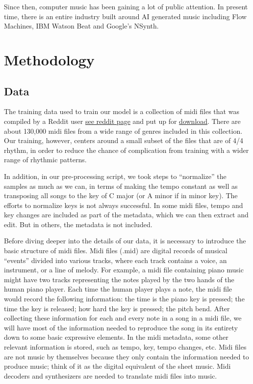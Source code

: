 \documentclass[12pt,oneside]{chicagocapstone}
\begin{document}
Since then, computer music has been gaining a lot of public attention. In present time, there is an entire industry built around AI generated music including Flow Machines, IBM Watson Beat and Google's NSynth.

\newpage

\hypertarget{methodology}{%
\chapter*{Methodology}\label{methodology}}

\hypertarget{methodology-data}{%
\section*{Data}\label{methodology-data}}

The training data used to train our model is a collection of midi files that was compiled by a Reddit user \href{https://www.reddit.com/r/WeAreTheMusicMakers/comments/3ajwe4/the_largest_midi_collection_on_the_internet/}{see reddit page} and put up for \href{https://mega.co.nz/\#!Elg1TA7T!MXEZPzq9s9YObiUcMCoNQJmCbawZqzAkHzY4Ym6Gs_Q}{download}. There are about 130,000 midi files from a wide range of genres included in this collection. Our training, however, centers around a small subset of the files that are of 4/4 rhythm, in order to reduce the chance of complication from training with a wider range of rhythmic patterns.

In addition, in our pre-processing script, we took steps to ``normalize'' the samples as much as we can, in terms of making the tempo constant as well as transposing all songs to the key of C major (or A minor if in minor key). The efforts to normalize keys is not always successful. In some midi files, tempo and key changes are included as part of the metadata, which we can then extract and edit. But in others, the metadata is not included.

Before diving deeper into the details of our data, it is necessary to introduce the basic structure of midi files. Midi files (.mid) are digital records of musical ``events'' divided into various tracks, where each track contains a voice, an instrument, or a line of melody. For example, a midi file containing piano music might have two tracks representing the notes played by the two hands of the human piano player. Each time the human player plays a note, the midi file would record the following information: the time is the piano key is pressed; the time the key is released; how hard the key is pressed; the pitch bend. After collecting these information for each and every note in a song in a midi file, we will have most of the information needed to reproduce the song in its entirety down to some basic expressive elements. In the midi metadata, some other relevant information is stored, such as tempo, key, tempo changes, etc. Midi files are not music by themselves because they only contain the information needed to produce music; think of it as the digital equivalent of the sheet music. Midi decoders and synthesizers are needed to translate midi files into music.
\end{document}
